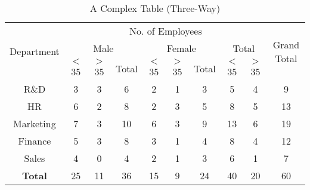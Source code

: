 \documentclass[
10pt, %
a4paper, %
]{report}
\begin{document}
\begin{table}[] %
\begin{center}
\begin{tabular}{|cl|cccccccc|c|}
\hline
\multicolumn{2}{|c|}{\multirow{3}{*}{Department}} &
  \multicolumn{8}{c|}{No. of Employees} &
  \multirow{3}{*}{Grand Total} \\ \cline{3-10}
\multicolumn{2}{|c|}{} &
  \multicolumn{3}{c|}{Male} &
  \multicolumn{3}{c|}{Female} &
  \multicolumn{2}{c|}{Total} &
   \\ \cline{3-10}
\multicolumn{2}{|c|}{} &
  \multicolumn{1}{c|}{\(<\) 35} &
  \multicolumn{1}{c|}{\(>\) 35} &
  \multicolumn{1}{c|}{Total} &
  \multicolumn{1}{c|}{\(<\) 35} &
  \multicolumn{1}{c|}{\(>\) 35} &
  \multicolumn{1}{c|}{Total} &
  \multicolumn{1}{c|}{\(<\) 35} &
  \(>\) 35 &
   \\ \hline
\multicolumn{2}{|c|}{R\&D} &
  \multicolumn{1}{c|}{3} &
  \multicolumn{1}{c|}{3} &
  \multicolumn{1}{c|}{6} &
  \multicolumn{1}{c|}{2} &
  \multicolumn{1}{c|}{1} &
  \multicolumn{1}{c|}{3} &
  \multicolumn{1}{c|}{5} &
  4 &
  9 \\ \hline
\multicolumn{2}{|c|}{HR} &
  \multicolumn{1}{c|}{6} &
  \multicolumn{1}{c|}{2} &
  \multicolumn{1}{c|}{8} &
  \multicolumn{1}{c|}{2} &
  \multicolumn{1}{c|}{3} &
  \multicolumn{1}{c|}{5} &
  \multicolumn{1}{c|}{8} &
  5 &
  13 \\ \hline
\multicolumn{2}{|c|}{Marketing} &
  \multicolumn{1}{c|}{7} &
  \multicolumn{1}{c|}{3} &
  \multicolumn{1}{c|}{10} &
  \multicolumn{1}{c|}{6} &
  \multicolumn{1}{c|}{3} &
  \multicolumn{1}{c|}{9} &
  \multicolumn{1}{c|}{13} &
  6 &
  19 \\ \hline
\multicolumn{2}{|c|}{Finance} &
  \multicolumn{1}{c|}{5} &
  \multicolumn{1}{c|}{3} &
  \multicolumn{1}{c|}{8} &
  \multicolumn{1}{c|}{3} &
  \multicolumn{1}{c|}{1} &
  \multicolumn{1}{c|}{4} &
  \multicolumn{1}{c|}{8} &
  4 &
  12 \\ \hline
\multicolumn{2}{|c|}{Sales} &
  \multicolumn{1}{c|}{4} &
  \multicolumn{1}{c|}{0} &
  \multicolumn{1}{c|}{4} &
  \multicolumn{1}{c|}{2} &
  \multicolumn{1}{c|}{1} &
  \multicolumn{1}{c|}{3} &
  \multicolumn{1}{c|}{6} &
  1 &
  7 \\ \hline
\multicolumn{2}{|c|}{\textbf{Total}} &
  \multicolumn{1}{c|}{25} &
  \multicolumn{1}{c|}{11} &
  \multicolumn{1}{c|}{36} &
  \multicolumn{1}{c|}{15} &
  \multicolumn{1}{c|}{9} &
  \multicolumn{1}{c|}{24} &
  \multicolumn{1}{c|}{40} &
  20 &
  60 \\ \hline
\end{tabular}
\end{center}
\caption{A Complex Table (Three-Way)}
\label{tab:complex_threeway}
\end{table}
\end{document}
